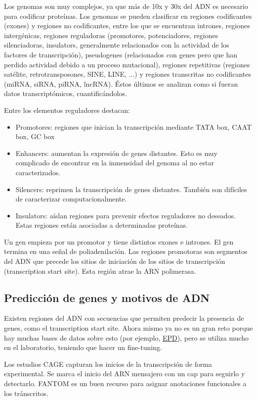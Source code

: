 Los genomas son muy complejos, ya que más de 10x y 30x del ADN es necesario para codificar proteínas. Los genomas se pueden clasificar en regiones codificantes (exones) y regiones no codificantes, entre los que se encuentran intrones, regiones intergénicas, regiones reguladoras (promotores, potenciadores, regiones silenciadoras, insulators, generalmente relacionados con la actividad de los factores de transcripción), pseudogenes (relacionados con genes pero que han perdido actividad debido a un proceso mutacional), regiones repetitivas (regiones satélite, retrotransposones, SINE, LINE, ...) y regiones transcritas no codificantes (miRNA, siRNA, piRNA, lncRNA). Éstos últimos se analizan como si fueran datos transcriptómicos, cuantificándolos. 

Entre los elementos reguladores destacan:
\begin{itemize}
\item Promotores: regiones que inician la transcripción mediante TATA box, CAAT box, GC box
\item Enhancers: aumentan la expresión de genes distantes. Esto es muy complicado de encontrar en la inmensidad del genoma al no estar caracterizados.
\item Silencers: reprimen la transcripción de genes distantes. También son difíciles de caracterizar computacionalmente. 
\item Insulators: aíslan regiones para prevenir efectos reguladores no deseados. Estas regiones están asociadas a determinadas proteínas. 
\end{itemize}

Un gen empieza por un promotor y tiene distintos exones e intrones. El gen termina en una señal de poliadenilación. Las regiones promotoras son segmentos del ADN que precede los sitios de iniciación de los sitios de transcripción (transcription start site). Esta región atrae la ARN polimerasa.

\subsection{Predicción de genes y motivos de ADN}
Existen regiones del ADN con secuencias que permiten predecir la presencia de genes, como el transcription start site. Ahora mismo ya no es un gran reto porque hay muchas bases de datos sobre esto (por ejemplo, \href{http://epd.vital-it.ch}{EPD}), pero se utiliza mucho en el laboratorio, teniendo que hacer un fine-tuning. 

Los estudios CAGE capturan los inicios de la transcripción de forma experimental. Se marca el inicio del ARN mensajero con un cap para seguirlo y detectarlo. FANTOM es un buen recurso para asignar anotaciones funcionales a los tránscritos. 

